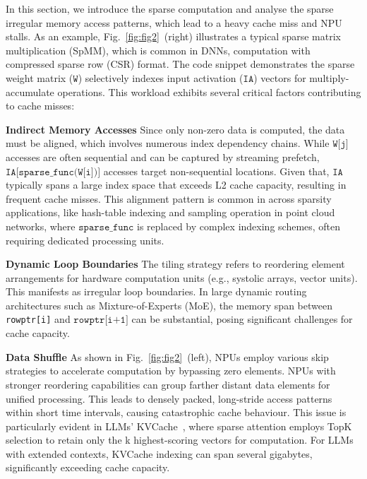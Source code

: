 In this section, we introduce the sparse computation and analyse the sparse irregular memory access patterns, which lead to a heavy cache miss and NPU stalls.
As an example, Fig.~\ref{fig:fig2}~(right) illustrates a typical sparse matrix multiplication (SpMM), which is common in DNNs, computation with compressed sparse row (CSR) format. The code snippet demonstrates the sparse weight matrix ($\texttt{W}$) selectively indexes input activation ($\texttt{IA}$) vectors for multiply-accumulate operations.
This workload exhibits several critical factors contributing to cache misses: 



\noindent\textbf{Indirect Memory Accesses} Since only non-zero data is computed, the data must be aligned, which involves numerous index dependency chains.
While $\texttt{W[j]}$ accesses are often sequential and can be captured by streaming prefetch, $\texttt{IA[sparse\_func(W[i])]}$ accesses target non-sequential locations. Given that, $\texttt{IA}$ typically spans a large index space that exceeds L2 cache capacity, resulting in frequent cache misses. This alignment pattern is common in across sparsity applications, like hash-table indexing 
and sampling operation in point cloud networks, where $\texttt{sparse\_func}$ is replaced by complex indexing schemes, often requiring dedicated processing units.


\noindent\textbf{Dynamic Loop Boundaries} %
The tiling strategy refers to reordering element arrangements for hardware computation units (e.g., systolic arrays, vector units). This manifests as irregular loop boundaries. In large dynamic routing architectures such as Mixture-of-Experts (MoE), the memory span between \texttt{rowptr[i]} and $\texttt{rowptr[i+1]}$ can be substantial, posing significant challenges for cache capacity. %



\noindent\textbf{Data Shuffle} 
As shown in Fig.~\ref{fig:fig2}~(left), NPUs employ various skip strategies to accelerate computation by bypassing zero elements. 
NPUs with stronger reordering capabilities can group farther distant data elements for unified processing. 
This leads to densely packed, long-stride access patterns within short time intervals, causing catastrophic cache behaviour.
This issue is particularly evident in LLMs' KVCache~\cite{21doublesparsity}, where sparse attention employs TopK selection to retain only the k highest-scoring vectors for computation. For LLMs with extended contexts, KVCache indexing can span several gigabytes, significantly exceeding cache capacity.


